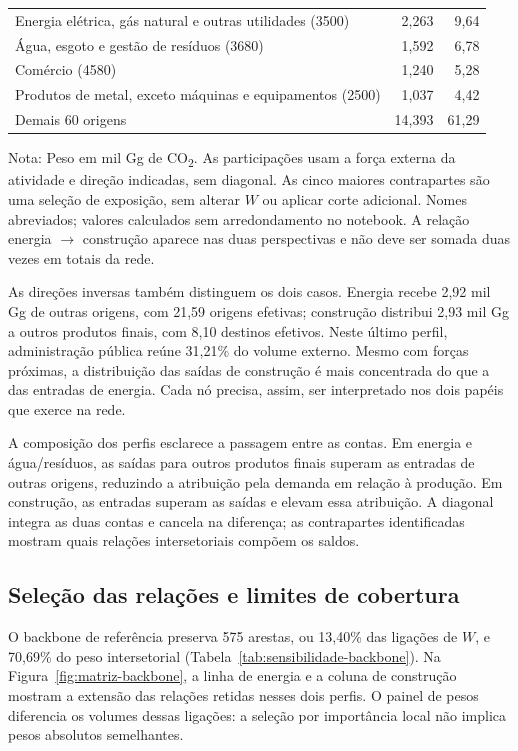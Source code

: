 \begin{table}[!ht]
\begin{tabular}{@{}>{\raggedright\arraybackslash}p{}rr@{}}
Energia elétrica, gás natural e outras utilidades (3500) & 2,263 & 9,64 \\
Água, esgoto e gestão de resíduos (3680) & 1,592 & 6,78 \\
Comércio (4580) & 1,240 & 5,28 \\
Produtos de metal, exceto máquinas e equipamentos (2500) & 1,037 & 4,42 \\
Demais 60 origens & 14,393 & 61,29 \\
\bottomrule
\end{tabular}
\begin{notas}
Nota: Peso em mil Gg de CO\textsubscript{2}. As participações usam a força externa da atividade e direção indicadas, sem diagonal. As cinco maiores contrapartes são uma seleção de exposição, sem alterar $W$ ou aplicar corte adicional. Nomes abreviados; valores calculados sem arredondamento no notebook. A relação energia $\rightarrow$ construção aparece nas duas perspectivas e não deve ser somada duas vezes em totais da rede.
\end{notas}
\end{table}

As direções inversas também distinguem os dois casos. Energia recebe 2,92 mil Gg de outras origens, com 21,59 origens efetivas; construção distribui 2,93 mil Gg a outros produtos finais, com 8,10 destinos efetivos. Neste último perfil, administração pública reúne 31,21\% do volume externo. Mesmo com forças próximas, a distribuição das saídas de construção é mais concentrada do que a das entradas de energia. Cada nó precisa, assim, ser interpretado nos dois papéis que exerce na rede.

A composição dos perfis esclarece a passagem entre as contas. Em energia e água/resíduos, as saídas para outros produtos finais superam as entradas de outras origens, reduzindo a atribuição pela demanda em relação à produção. Em construção, as entradas superam as saídas e elevam essa atribuição. A diagonal integra as duas contas e cancela na diferença; as contrapartes identificadas mostram quais relações intersetoriais compõem os saldos.

\clearpage
\subsection{Seleção das relações e limites de cobertura}

O backbone de referência preserva 575 arestas, ou 13,40\% das ligações de $W$, e 70,69\% do peso intersetorial (Tabela~\ref{tab:sensibilidade-backbone}). Na Figura~\ref{fig:matriz-backbone}, a linha de energia e a coluna de construção mostram a extensão das relações retidas nesses dois perfis. O painel de pesos diferencia os volumes dessas ligações: a seleção por importância local não implica pesos absolutos semelhantes.


